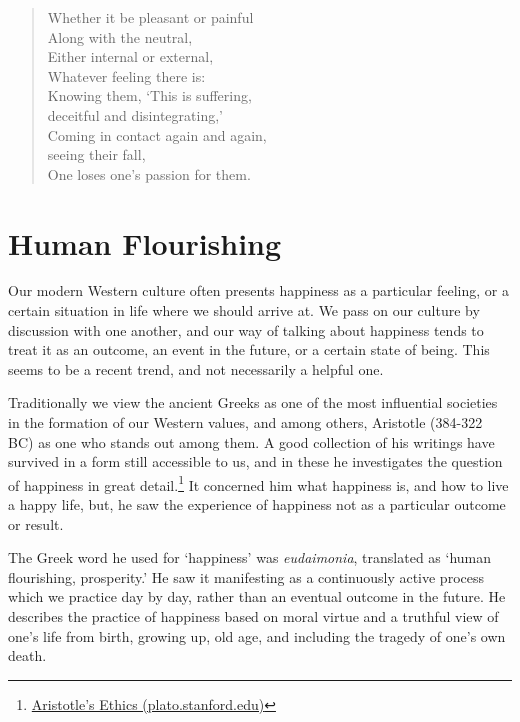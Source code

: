 \begin{quote}
Whether it be pleasant or painful\\
Along with the neutral,\\
Either internal or external,\\
Whatever feeling there is:\\
Knowing them, `This is suffering,\\
deceitful and disintegrating,'\\
Coming in contact again and again,\\
seeing their fall,\\
One loses one's passion for them.

\bigskip

\end{quote}

\clearpage

\section{Human Flourishing}


Our modern Western culture often presents happiness as a particular
feeling, or a certain situation in life where we should arrive at. We
pass on our culture by discussion with one another, and our way of
talking about happiness tends to treat it as an outcome, an event in the
future, or a certain state of being. This seems to be a recent trend,
and not necessarily a helpful one.

Traditionally we view the ancient Greeks as one of the most influential
societies in the formation of our Western values, and among others,
Aristotle (384-322 BC) as one who stands out among them. A good
collection of his writings have survived in a form still accessible to
us, and in these he investigates the question of happiness in great
detail.\footnote{\href{https://plato.stanford.edu/entries/aristotle-ethics/}{Aristotle's
  Ethics (plato.stanford.edu)}} It concerned him what happiness is, and
how to live a happy life, but, he saw the experience of happiness not as
a particular outcome or result.

The Greek word he used for `happiness' was \emph{eudaimonia}, translated
as `human flourishing, prosperity.' He saw it manifesting as a
continuously active process which we practice day by day, rather than an
eventual outcome in the future. He describes the practice of happiness
based on moral virtue and a truthful view of one's life from birth,
growing up, old age, and including the tragedy of one's own death.

